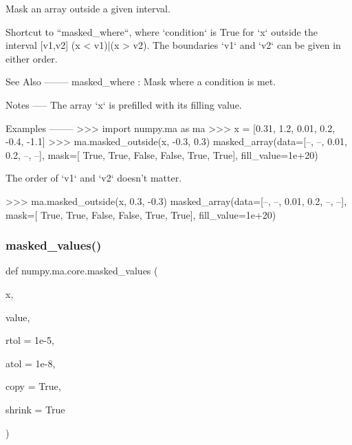 \begin{DoxyVerb}Mask an array outside a given interval.

Shortcut to ``masked_where``, where `condition` is True for `x` outside
the interval [v1,v2] (x < v1)|(x > v2).
The boundaries `v1` and `v2` can be given in either order.

See Also
--------
masked_where : Mask where a condition is met.

Notes
-----
The array `x` is prefilled with its filling value.

Examples
--------
>>> import numpy.ma as ma
>>> x = [0.31, 1.2, 0.01, 0.2, -0.4, -1.1]
>>> ma.masked_outside(x, -0.3, 0.3)
masked_array(data=[--, --, 0.01, 0.2, --, --],
             mask=[ True,  True, False, False,  True,  True],
       fill_value=1e+20)

The order of `v1` and `v2` doesn't matter.

>>> ma.masked_outside(x, 0.3, -0.3)
masked_array(data=[--, --, 0.01, 0.2, --, --],
             mask=[ True,  True, False, False,  True,  True],
       fill_value=1e+20)\end{DoxyVerb}
 \mbox{\label{namespacenumpy_1_1ma_1_1core_a70c5c910690e11346059238b0e0d1d72}} 
\subsubsection{\texorpdfstring{masked\+\_\+values()}{masked\_values()}}
{\footnotesize\ttfamily def numpy.\+ma.\+core.\+masked\+\_\+values (\begin{DoxyParamCaption}\item[{}]{x,  }\item[{}]{value,  }\item[{}]{rtol = {\ttfamily 1e-\/5},  }\item[{}]{atol = {\ttfamily 1e-\/8},  }\item[{}]{copy = {\ttfamily True},  }\item[{}]{shrink = {\ttfamily True} }\end{DoxyParamCaption})}

